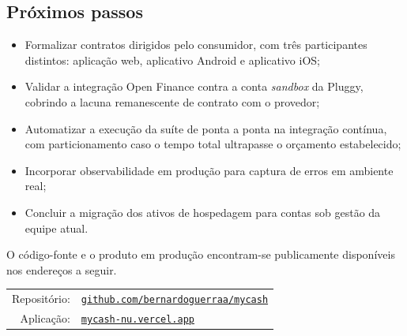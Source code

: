 \documentclass[12pt,a4paper]{article}
\begin{document}
\subsection{Próximos passos}

\begin{itemize}
    \item Formalizar contratos dirigidos pelo consumidor, com três participantes distintos: aplicação web, aplicativo Android e aplicativo iOS;
    \item Validar a integração Open Finance contra a conta \textit{sandbox} da Pluggy, cobrindo a lacuna remanescente de contrato com o provedor;
    \item Automatizar a execução da suíte de ponta a ponta na integração contínua, com particionamento caso o tempo total ultrapasse o orçamento estabelecido;
    \item Incorporar observabilidade em produção para captura de erros em ambiente real;
    \item Concluir a migração dos ativos de hospedagem para contas sob gestão da equipe atual.
\end{itemize}

O código-fonte e o produto em produção encontram-se publicamente disponíveis nos endereços a seguir.

\begin{center}
\begin{tabular}{@{}rl@{}}
Repositório: & \href{https://github.com/bernardoguerraa/mycash}{\texttt{github.com/bernardoguerraa/mycash}} \\
Aplicação: & \href{https://mycash-nu.vercel.app}{\texttt{mycash-nu.vercel.app}} \\
\end{tabular}
\end{center}
\end{document}
